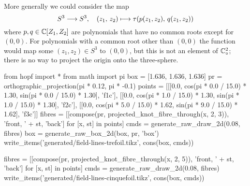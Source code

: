 More generally we could consider the map
\[ S^3 \longrightarrow S^3, \quad (z_1, \, z_2) \longmapsto \tau(p(z_1, z_2),\, q(z_1, z_2))  \]
where $p, q \in \mathbb{C}[Z_1, Z_2]$ are polynomials that have no common roots except for $(0, 0)$.
For polynomials with a common root other than $(0, 0)$ the function
would map some $(z_1, z_2) \in S^3$ to $(0, 0)$,
but this is not an element of $\mathbb{C}^2_\circ$;
there is no way to project the origin onto the three-sphere.

\begin{python}
from hopf import *
from math import pi
box       = [1.636, 1.636, 1.636]
pr        = orthographic_projection(pi * 0.12, pi * -0.1)
points    = [[[0.0, cos(pi * 0.0 / 15.0) * 1.30, sin(pi * 0.0 / 15.0) * 1.30], 'f1c'],
             [[0.0, cos(pi * 1.0 / 15.0) * 1.30, sin(pi * 1.0 / 15.0) * 1.30], 'f2c'],
             [[0.0, cos(pi * 5.0 / 15.0) * 1.62, sin(pi * 9.0 / 15.0) * 1.62], 'f3c']]
fibres    = [[compose(pr, projected_knot_fibre_through(x, 2, 3)),
              'front, ' + st, 'back'] for [x, st] in points]
cmds      = generate_raw_draw_2d(0.08, fibres)
box       = generate_raw_box_2d(box, pr, 'box')
write_items('generated/field-lines-trefoil.tikz', cons(box, cmds))

fibres    = [[compose(pr, projected_knot_fibre_through(x, 2, 5)),
              'front, ' + st, 'back'] for [x, st] in points]
cmds      = generate_raw_draw_2d(0.08, fibres)
write_items('generated/field-lines-cinquefoil.tikz', cons(box, cmds))
\end{python}
\begin{figure}
\tikzexternalenable
{}
\hspace{0.5em} %
\vspace{1em}
\end{figure}

